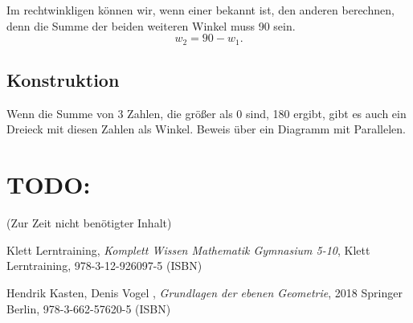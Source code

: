 \documentclass[a4paper]{amsart}
\theoremstyle{definition}
\begin{document}
Im rechtwinkligen können wir, wenn einer bekannt ist, den anderen berechnen, denn die Summe der beiden weiteren Winkel muss 90 sein.
\begin{equation}\label{berechnenRecht}
   w_2 = 90 - w_1.
\end{equation}

\subsection{Konstruktion}
Wenn die Summe von 3 Zahlen, die größer als 0 sind, 180 ergibt, gibt es auch ein Dreieck mit diesen Zahlen als Winkel. Beweis über ein Diagramm mit Parallelen. 

\section{TODO:}
\begin{backup}
    (Zur Zeit nicht benötigter Inhalt)
\end{backup}

\begin{thebibliography}{9}

      Klett Lerntraining, \emph{Komplett Wissen Mathematik Gymnasium 5-10},
      Klett Lerntraining, 978-3-12-926097-5 (ISBN)
      
       Hendrik Kasten, Denis Vogel , \emph{Grundlagen der ebenen Geometrie},
      2018 Springer Berlin, 978-3-662-57620-5 (ISBN)

\end{thebibliography}
\end{document}
